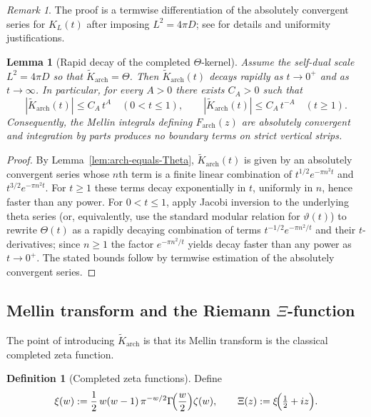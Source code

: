 \documentclass[11pt]{amsart}
\newtheorem{lemma}[theorem]{Lemma}
\theoremstyle{definition}
\newtheorem{definition}[theorem]{Definition}
\theoremstyle{remark}
\newtheorem{remark}[theorem]{Remark}
\begin{document}
\begin{remark}
The proof is a termwise differentiation of the absolutely convergent series for $K_L(t)$ after
imposing $L^2=4\pi D$; see \cite{PaperI} for details and uniformity justifications.
\end{remark}

\begin{lemma}[Rapid decay of the completed $\Theta$-kernel]\label{lem:Theta-rapid-decay}
Assume the self-dual scale $L^2=4\pi D$ so that $\widetilde K_{\mathrm{arch}}=\Theta$.
Then $\widetilde K_{\mathrm{arch}}(t)$ decays rapidly as $t\to 0^+$ and as $t\to\infty$.
In particular, for every $A>0$ there exists $C_A>0$ such that
\[
|\widetilde K_{\mathrm{arch}}(t)|\le C_A\,t^{A}\quad (0<t\le 1),
\qquad
|\widetilde K_{\mathrm{arch}}(t)|\le C_A\,t^{-A}\quad (t\ge 1).
\]
Consequently, the Mellin integrals defining $F_{\mathrm{arch}}(z)$ are absolutely convergent and
integration by parts produces no boundary terms on strict vertical strips.
\end{lemma}

\begin{proof}
By Lemma~\ref{lem:arch-equals-Theta}, $\widetilde K_{\mathrm{arch}}(t)$ is given by an absolutely
convergent series whose $n$th term is a finite linear combination of $t^{1/2}e^{-\pi n^2 t}$ and
$t^{3/2}e^{-\pi n^2 t}$. For $t\ge 1$ these terms decay exponentially in $t$, uniformly in $n$, hence
faster than any power. For $0<t\le 1$, apply Jacobi inversion to the underlying theta series (or,
equivalently, use the standard modular relation for $\vartheta(t)$) to rewrite $\Theta(t)$ as a
rapidly decaying combination of terms $t^{-1/2}e^{-\pi n^2/t}$ and their $t$-derivatives; since $n\ge1$
the factor $e^{-\pi n^2/t}$ yields decay faster than any power as $t\to0^+$. The stated bounds follow
by termwise estimation of the absolutely convergent series.
\end{proof}

\subsection{Mellin transform and the Riemann $\Xi$-function}

The point of introducing $\widetilde K_{\mathrm{arch}}$ is that its Mellin transform is the classical
completed zeta function.

\begin{definition}[Completed zeta functions]
\label{def:xi-Xi}
Define
\[
\xi(w)
:=
\frac12\,w(w-1)\,\pi^{-w/2}\Gamma\!\Bigl(\frac{w}{2}\Bigr)\zeta(w),
\qquad
\Xi(z):=\xi\!\Bigl(\tfrac12+iz\Bigr).
\]
\end{definition}
\end{document}
